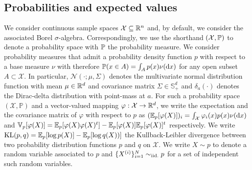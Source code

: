 \subsection*{Probabilities and expected values}
We consider continuous sample spaces $\mathcal X\subseteq \R^{n}$ and, by default, we consider the associated Borel $\sigma$-algebra. 
Correspondingly, we use the shorthand $(\mathcal X,\P)$ to denote a probability space with $\P$ the probability measure. 
We consider probability measures that admit a probability density function $p$ with respect to a base measure $\nu$ with therefore $\P(x\in A)=\int_{A}p(x)\nudx$ for any open subset $A\subset \mathcal X$. 
In particular, $\mathcal N(\cdot; \mu,\Sigma)$ denotes the multivariate normal distribution function with mean $\mu\in \R^{d}$ and covariance matrix $\Sigma\in\mathbb S^{d}_+$ and $\delta_a(\cdot)$ denotes the Dirac-delta distribution with point-mass at $a$. 
For such a probability space $(\mathcal X, \mathbb P)$ and a vector-valued mapping $\varphi:\mathcal X\to\R^{d}$, we write the expectation and the covariance matrix of $\varphi$ with respect to $p$ as $(\E_{p}[\varphi(X)])_{i}=\int_{\mathcal X}\varphi_{i}(x)p(x)\nudx$ and $\V_{p}[\varphi(X)]=\E_{p}[\varphi(X)\varphi(X)^{t}]-\E_{p}[\varphi(X)]\E_{p}[\varphi(X)]^{t}$ respectively. 
We write $\KL{p,q}=\E_{p}[\log p(X)]-\E_{p}[\log q(X))]$ the Kullback-Leibler divergence between two probability distribution functions $p$ and $q$ on $\mathcal X$. We write $X\sim p$ to denote a random variable associated to $p$ and $\{X^{(i)}\}_{i=1}^{N}\simiid p$ for a set of independent such random variables.
%

